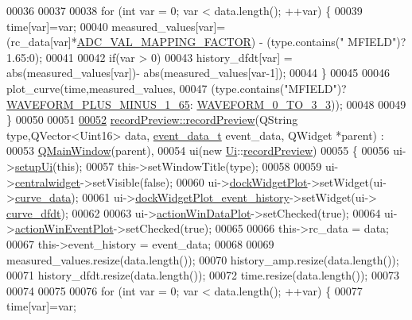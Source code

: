 \begin{DoxyCode}
00036 
00037     
00038     \textcolor{keywordflow}{for} (\textcolor{keywordtype}{int} var = 0; var < data.length(); ++var) \{
00039         time[var]=var;
00040         measured\_values[var]=(rc\_data[var]*\hyperlink{a00086_ada92d3eeeec0cbeee41e76a52d145792}{ADC\_VAL\_MAPPING\_FACTOR}) - (type.contains(\textcolor{stringliteral}{"
      MFIELD"})?1.65:0);
00041 
00042         \textcolor{keywordflow}{if}(var > 0)
00043             history\_dfdt[var] = abs(measured\_values[var])- abs(measured\_values[var-1]);
00044     \}
00045 
00046     plot\_curve(time,measured\_values,
00047               (type.contains(\textcolor{stringliteral}{"MFIELD"})?\hyperlink{a00090_a0923d3b365a36e1e8c401cec964aa36f}{WAVEFORM\_PLUS\_MINUS\_1\_65}:
      \hyperlink{a00090_ae18fed2471b16a8516d721ff60671dd9}{WAVEFORM\_0\_TO\_3\_3}));
00048 
00049 \}
00050 
00051 
\hypertarget{a00129_source_l00052}{}\hyperlink{a00073_a3415d6b4da7b24b0bf8674a20f4c65cf}{00052} \hyperlink{a00073_a03ad4ae83a5594f6dc337c7b71873edd}{recordPreview::recordPreview}(QString type,QVector<Uint16> data, 
      \hyperlink{a00006_d6/d7d/a00161}{event\_data\_t} event\_data, QWidget *parent) :
00053     \hyperlink{a00058}{QMainWindow}(parent),
00054     ui(new \hyperlink{a00145}{Ui}::\hyperlink{a00073}{recordPreview})
00055 \{
00056     ui->\hyperlink{a00081_afa41dc070a896a5eae476f3c0206825c}{setupUi}(\textcolor{keyword}{this});
00057     this->setWindowTitle(type);
00058 
00059     ui->\hyperlink{a00081_ac9ab4609922159e8e4cc45905f76928e}{centralwidget}->setVisible(\textcolor{keyword}{false});
00060     ui->\hyperlink{a00081_a07b76f17803ec09e0367b72938bbd097}{dockWidgetPlot}->setWidget(ui->\hyperlink{a00081_a247d94481323c0bc4f8b6458a8a535dd}{curve\_data});
00061     ui->\hyperlink{a00081_a2a8f7ee8d4458dd20481c8a1c29ce185}{dockWidgetPlot\_event\_history}->setWidget(ui->
      \hyperlink{a00081_a43d24fa14d90cc27b310542e39dcdd1b}{curve\_dfdt});
00062 
00063     ui->\hyperlink{a00081_aa09067a9c96c9cd78f75261a9fcb89f0}{actionWinDataPlot}->setChecked(\textcolor{keyword}{true});
00064     ui->\hyperlink{a00081_ac72ec9c8679d46fd43a87f99ee6db893}{actionWinEventPlot}->setChecked(\textcolor{keyword}{true});
00065 
00066     this->rc\_data       = data;
00067     this->event\_history  = event\_data;
00068 
00069     measured\_values.resize(data.length());
00070     history\_amp.resize(data.length());
00071     history\_dfdt.resize(data.length());
00072     time.resize(data.length());
00073 
00074 
00075 
00076     \textcolor{keywordflow}{for} (\textcolor{keywordtype}{int} var = 0; var < data.length(); ++var) \{
00077         time[var]=var;

\end{DoxyCode}
